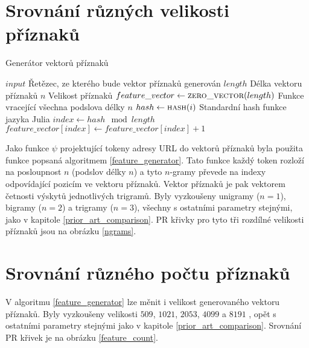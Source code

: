 
\section{Srovnání různých velikosti příznaků}

\begin{algorithm}
	\caption{Generátor vektorů příznaků}
	\label{feature_generator}
	\begin{algorithmic}
		\Require $ input $ \Comment Řetězec, ze kterého bude vektor příznaků generován
		\Require $ length $ \Comment Délka vektoru příznaků
		\Require $ n $ \Comment Velikost příznaků
		\Statex
		\State $ feature\_vector \gets \Call{zero\_vector}{length} $
		 \Comment Funkce vracející všechna podslova délky $ n $
			\State $ hash \gets \Call{hash}{i} $ \Comment Standardní hash funkce jazyka Julia
			\State $ index \gets hash \mod length $
			\State $ feature\_vector \left[ index \right] \gets feature\_vector \left[ index \right] + 1 $
		\EndFor
	\end{algorithmic}
\end{algorithm}

Jako funkce \( \psi \) projektující tokeny adresy URL do vektorů příznaků byla použita funkce popsaná algoritmem \ref{feature_generator}. Tato funkce každý token rozloží na posloupnost \( n \) (podslov délky \( n \)) a tyto \( n \)-gramy převede na indexy odpovídající pozicím ve vektoru příznaků. Vektor příznaků je pak vektorem četnosti výskytů jednotlivých trigramů. Byly vyzkoušeny unigramy (\( n = 1 \)), bigramy  (\( n = 2 \)) a trigramy (\( n = 3 \)), všechny s ostatními parametry stejnými, jako v kapitole \ref{prior_art_comparison}. PR křivky pro tyto tři rozdílné velikosti příznaků jsou na obrázku \ref{ngrams}.


\section{Srovnání různého počtu příznaků}
V algoritmu \ref{feature_generator} lze měnit i velikost generovaného vektoru příznaků. Byly vyzkoušeny velikosti \( 509 \), \( 1021 \), \( 2053 \), \( 4099 \) a \( 8191 \) , opět s ostatními parametry stejnými jako v kapitole \ref{prior_art_comparison}. Srovnání PR křivek je na obrázku \ref{feature_count}.

